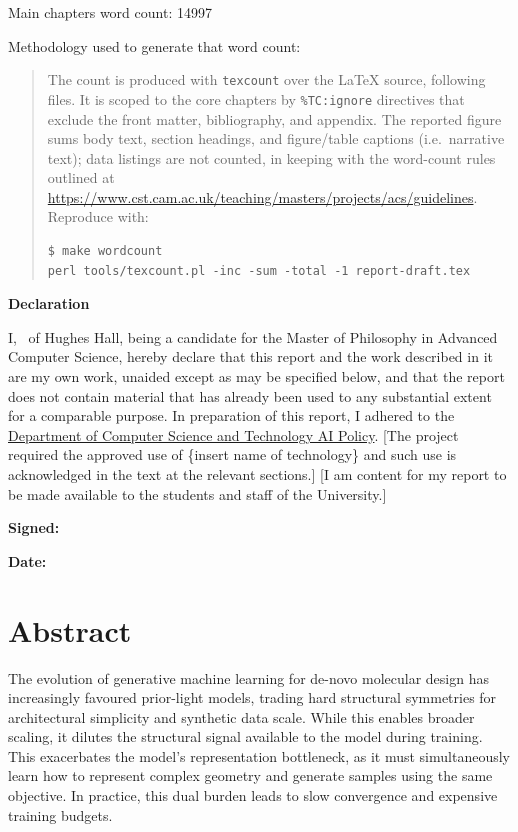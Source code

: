 \documentclass[12pt,a4paper,twoside]{report}
\newif\ifsubmission
\newcommand{\candidatenumber}{TODO}
\newcommand{\college}{Hughes Hall}
\newcommand{\coursefor}{the Master of Philosophy in Advanced Computer Science}
\begin{document}
\begin{sffamily}
Main chapters word count: 14997

Methodology used to generate that word count:

\begin{quote}
The count is produced with \texttt{texcount} over the \LaTeX{} source, following
\verb|| files. It is scoped to the core chapters by \verb|%TC:ignore|
directives that exclude the front matter, bibliography, and appendix. The
reported figure sums body text, section headings, and figure/table captions
(i.e.\ narrative text); data listings are not counted, in keeping with
the word-count rules outlined at
\url{https://www.cst.cam.ac.uk/teaching/masters/projects/acs/guidelines}. Reproduce with:
\begin{verbatim}
$ make wordcount
perl tools/texcount.pl -inc -sum -total -1 report-draft.tex
\end{verbatim}
\end{quote}

\end{sffamily}

\vspace{\fill}
\onehalfspacing
\textbf{\Huge Declaration}
\vspace{40pt}

I,
\makeatletter\ifsubmission
\candidatenumber,
\else
\@author\ of \college,
\fi\makeatother
being a candidate for \coursefor, hereby declare that this report and
the work described in it are my own work, unaided except as may be
specified below, and that the report does not contain material that
has already been used to any substantial extent for a comparable
purpose.
In preparation of this report, I adhered to the
\href{https://www.cst.cam.ac.uk/files/ai_policy.pdf}{Department of
Computer Science and Technology AI Policy}. [The project required
the approved use of \{insert name of technology\} and such use is
acknowledged in the text at the relevant sections.] [I am content for
my report to be made available to the students and staff of the
University.]



\ifsubmission\else
\bigskip
\textbf{Signed:}
\fi

\bigskip
\textbf{Date:}
\vspace{\fill}

\chapter*{Abstract}
The evolution of generative machine learning for de-novo molecular design has increasingly favoured prior-light models, trading hard structural symmetries for architectural simplicity and synthetic data scale. While this enables broader scaling, it dilutes the structural signal available to the model during training. This exacerbates the model's representation bottleneck, as it must simultaneously learn how to represent complex geometry and generate samples using the same objective. In practice, this dual burden leads to slow convergence and expensive training budgets.
\end{document}
